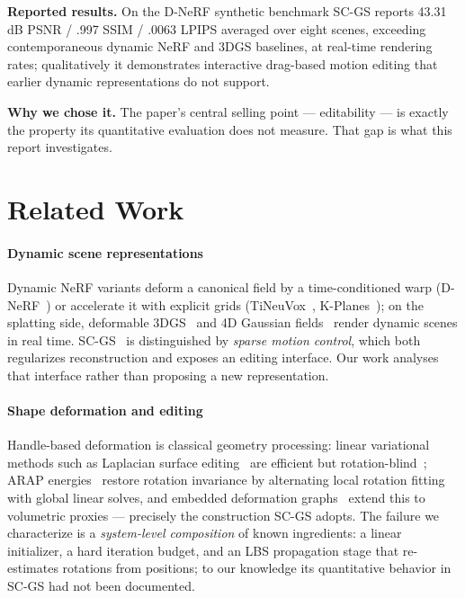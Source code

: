 \documentclass[10pt,twocolumn]{article}
\begin{document}
\textbf{Reported results.} On the D-NeRF synthetic benchmark SC-GS reports
43.31\,dB PSNR / .997 SSIM / .0063 LPIPS averaged over eight scenes, exceeding
contemporaneous dynamic NeRF and 3DGS baselines, at real-time rendering rates;
qualitatively it demonstrates interactive drag-based motion editing that
earlier dynamic representations do not support.

\textbf{Why we chose it.} The paper's central selling point --- editability ---
is exactly the property its quantitative evaluation does not measure. That gap
is what this report investigates.

\section{Related Work}
\label{sec:related}

\paragraph{Dynamic scene representations}
Dynamic NeRF variants deform a canonical field by a time-conditioned warp
(D-NeRF~\cite{dnerf}) or accelerate it with explicit grids
(TiNeuVox~\cite{tineuvox}, K-Planes~\cite{kplanes}); on the splatting side,
deformable 3DGS~\cite{deformable3dgs} and 4D Gaussian fields~\cite{4dgs} render
dynamic scenes in real time. SC-GS~\cite{scgs} is distinguished by \emph{sparse
motion control}, which both regularizes reconstruction and exposes an editing
interface. Our work analyses that interface rather than proposing a new
representation.

\paragraph{Shape deformation and editing}
Handle-based deformation is classical geometry processing: linear variational
methods such as Laplacian surface editing~\cite{lse} are efficient but
rotation-blind~\cite{botsch}; ARAP energies~\cite{arap} restore rotation
invariance by alternating local rotation fitting with global linear solves, and
embedded deformation graphs~\cite{embedded} extend this to volumetric proxies
--- precisely the construction SC-GS adopts. The failure we
characterize is a \emph{system-level composition} of known ingredients: a
linear initializer, a hard iteration budget, and an LBS propagation stage that
re-estimates rotations from positions; to our knowledge its quantitative
behavior in SC-GS had not been documented.
\end{document}

